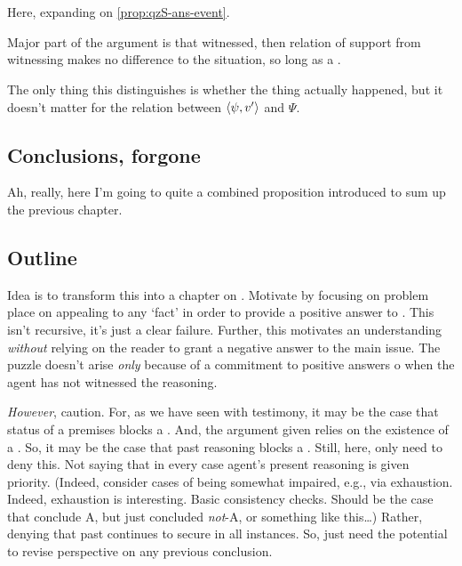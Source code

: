 \chapter{}
\label{cha:fcs}

\begin{note}
  \color{red}
  Here, expanding on \autoref{prop:qzS-ans-event}.

  Major part of the argument is that witnessed, then relation of support from witnessing makes no difference to the situation, so long as a \requ{}.

  The only thing this distinguishes is whether the thing actually happened, but it doesn't matter for the relation between \(\langle \psi, v' \rangle\) and \(\Psi\).
\end{note}

\section{Conclusions, forgone}
\label{sec:fc3-1}

\begin{note}
  \begin{quote}
    \propPotentialeventsRole*
  \end{quote}
  Ah, really, here I'm going to quite a combined proposition introduced to sum up the previous chapter.
\end{note}

\section{Outline}
\label{sec:outline}

\begin{note}
  Idea is to transform this into a chapter on \fc{}.
  Motivate \fc{} by focusing on problem  place on appealing to any `fact' in order to provide a positive answer to \qzS{}.
  This isn't recursive, it's just a clear failure.
  Further, this motivates an understanding \emph{without} relying on the reader to grant a negative answer to the main issue.
  The puzzle doesn't arise \emph{only} because of a commitment to positive answers o \qzS{} when the agent has not witnessed the reasoning.

  \emph{However}, caution.
  For, as we have seen with testimony, it may be the case that status of a premises blocks a \requ{}.
  And, the argument given relies on the existence of a \requ{}.
  So, it may be the case that past reasoning blocks a \requ{}.
  Still, here, only need to deny this.
  Not saying that in every case agent's present reasoning is given priority.
  (Indeed, consider cases of being somewhat impaired, e.g., via exhaustion.
  Indeed, exhaustion is interesting.
  Basic consistency checks.
  Should be the case that conclude A, but just concluded \emph{not}-A, or something like this\dots)
  Rather, denying that past continues to secure in all instances.
  So, just need the potential to revise perspective on any previous conclusion.
\end{note}


